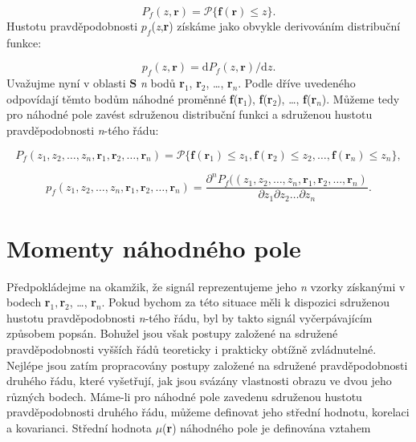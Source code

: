 \begin{equation} \label{eq:3_1}
    P_f(z, \mathbf{r}) = \mathscr{P}\{ \mathbf{f}(\mathbf{r}) \leq z\}.
\end{equation}
Hustotu pravděpodobnosti $p_f$(\textit{z},\textbf{r}) získáme jako obvykle derivováním distribuční funkce:

\begin{equation} \label{eq:3_2}
    p_f(z, \mathbf{r}) = \mathrm{d} P_f(z, \mathbf{r}) / \mathrm{d} z.
\end{equation}
Uvažujme nyní v oblasti $\mathbf{S}$ \textit{n} bodů \textbf{r}$_1$, \textbf{r}$_2$, \dots, \textbf{r}$_n$. Podle dříve uvedeného odpovídají těmto bodům náhodné proměnné \textbf{f}(\textbf{r}$_1$), \textbf{f}(\textbf{r}$_2$), \dots, \textbf{f}(\textbf{r}$_n$). Můžeme tedy pro náhodné pole zavést sdruženou distribuční funkci a sdruženou hustotu pravděpodobnosti \textit{n}-tého řádu:

\begin{equation} \label{eq:3_3}
    P_f(z_1, z_2, \dots, z_n, \mathbf{r}_1, \mathbf{r}_2, \dots, \mathbf{r}_n) = \mathscr{P} \{ \mathbf{f}( \mathbf{r}_1) \le z_1, \mathbf{f}(\mathbf{r}_2) \leq z_2, \dots, \mathbf{f}(\mathbf{r}_n) \leq z_n \},
\end{equation}

\begin{equation} \label{eq:3_4}
    p_f(z_1, z_2, \dots, z_n, \mathbf{r}_1, \mathbf{r}_2, \dots, \mathbf{r}_n) = \frac{\partial^n P_f( (z_1, z_2, \dots, z_n, \mathbf{r}_1, \mathbf{r}_2, \dots, \mathbf{r}_n )}{\partial z_1 \partial z_2 \dots \partial z_n}.
\end{equation}

\section*{Momenty náhodného pole}

\noindent Předpokládejme na okamžik, že signál reprezentujeme jeho \textit{n} vzorky získanými v bodech \textbf{r}$_1,$\textbf{r}$_2$, \dots, \textbf{r}$_n$. Pokud bychom za této situace měli k dispozici sdruženou hustotu pravděpodobnosti \textit{n}-tého řádu, byl by takto signál vyčerpávajícím způsobem popsán. Bohužel jsou však postupy založené na sdružené pravděpodobnosti vyšších řádů teoreticky i prakticky obtížně zvládnutelné. Nejlépe jsou zatím propracovány postupy založené na sdružené pravděpodobnosti druhého řádu, které vyšetřují, jak jsou svázány vlastnosti obrazu ve dvou jeho různých bodech. Máme-li pro náhodné pole zavedenu sdruženou hustotu pravděpodobnosti druhého řádu, můžeme definovat jeho střední hodnotu, korelaci a kovarianci. Střední hodnota $\mu$(\textbf{r}) náhodného pole je definována vztahem

